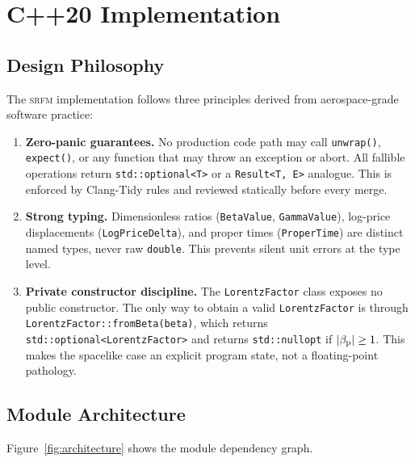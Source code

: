 \section{C++20 Implementation}
\label{sec:implementation}

\subsection{Design Philosophy}

The \textsc{srfm} implementation follows three principles derived from
aerospace-grade software practice:

\begin{enumerate}
  \item \textbf{Zero-panic guarantees.}  No production code path may call
        \texttt{unwrap()}, \texttt{expect()}, or any function that may
        throw an exception or abort.  All fallible operations return
        \texttt{std::optional<T>} or a \texttt{Result<T, E>} analogue.
        This is enforced by Clang-Tidy rules and reviewed statically before
        every merge.

  \item \textbf{Strong typing.}  Dimensionless ratios (\texttt{BetaValue},
        \texttt{GammaValue}), log-price displacements (\texttt{LogPriceDelta}),
        and proper times (\texttt{ProperTime}) are distinct named types, never
        raw \texttt{double}.  This prevents silent unit errors at the type
        level.

  \item \textbf{Private constructor discipline.}  The \texttt{LorentzFactor}
        class exposes no public constructor.  The only way to obtain a valid
        \texttt{LorentzFactor} is through \texttt{LorentzFactor::fromBeta(beta)},
        which returns \texttt{std::optional<LorentzFactor>} and returns
        \texttt{std::nullopt} if $|\beta_{\mathrm{p}}| \geq 1$.  This makes the
        spacelike case an explicit program state, not a floating-point pathology.
\end{enumerate}

\subsection{Module Architecture}

Figure~\ref{fig:architecture} shows the module dependency graph.


